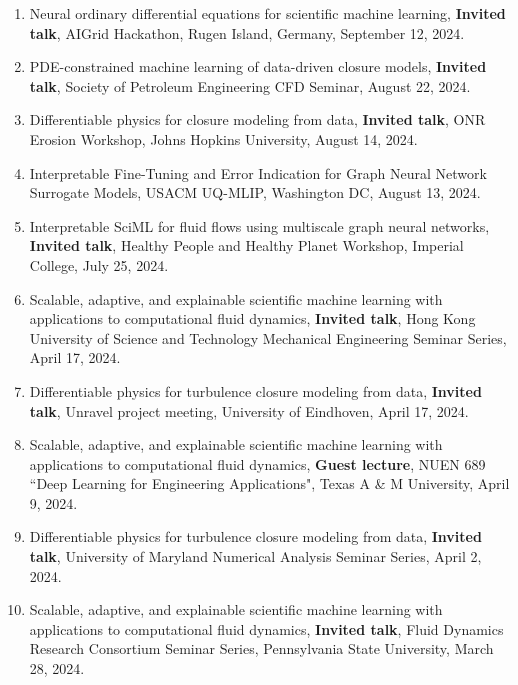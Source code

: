 \documentclass[letterpaper]{article}
\begin{document}
\begin{enumerate}
\item Neural ordinary differential equations for scientific machine learning, \textbf{Invited talk}, AIGrid Hackathon, Rugen Island, Germany, September 12, 2024.

\item PDE-constrained machine learning of data-driven closure models, \textbf{Invited talk}, Society of Petroleum Engineering CFD Seminar, August 22, 2024.

\item Differentiable physics for closure modeling from data, \textbf{Invited talk}, ONR Erosion Workshop, Johns Hopkins University, August 14, 2024.

\item Interpretable Fine-Tuning and Error Indication for Graph Neural Network Surrogate Models, USACM UQ-MLIP, Washington DC, August 13, 2024.

\item Interpretable SciML for fluid flows using multiscale graph neural networks, \textbf{Invited talk}, Healthy People and Healthy Planet Workshop, Imperial College, July 25, 2024.

\item Scalable, adaptive, and explainable scientific machine learning with applications to computational fluid dynamics, \textbf{Invited talk}, Hong Kong University of Science and Technology Mechanical Engineering Seminar Series, April 17, 2024.

\item Differentiable physics for turbulence closure modeling from data, \textbf{Invited talk}, Unravel project meeting, University of Eindhoven, April 17, 2024.

\item Scalable, adaptive, and explainable scientific machine learning with applications to computational fluid dynamics, \textbf{Guest lecture}, NUEN 689 ``Deep Learning for Engineering Applications", Texas A \& M University, April 9, 2024.

\item Differentiable physics for turbulence closure modeling from data, \textbf{Invited talk}, University of Maryland Numerical Analysis Seminar Series, April 2, 2024.

\item Scalable, adaptive, and explainable scientific machine learning with applications to computational fluid dynamics, \textbf{Invited talk}, Fluid Dynamics Research Consortium Seminar Series, Pennsylvania State University, March 28, 2024.


\end{enumerate}
\end{document}

